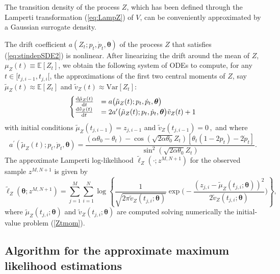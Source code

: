 \documentclass[11pt]{article}
\theoremstyle{definition}
\begin{document}
The transition density of the process $Z$, which has been defined through the Lamperti transformation (\ref{eq:LampZ}) of $V$, can be conveniently approximated by a Gaussian surrogate density. 

The drift coefficient $a(Z_t; p_t, \dot{p}_t, \bm{\theta}) $ of the process $Z$ that satisfies (\ref{eq:stindepSDE2}) is nonlinear. After linearizing the drift around the mean of $Z$, $\mu_Z(t) \equiv \mathbb{E}\left[Z_t\right]$,  we obtain the following system of ODEs to compute, for any $t\in [t_{j,i-1}, t_{j, i}[$, the approximations of the first two central moments of $Z$, say  $\tilde{\mu}_Z(t) \approx \mathbb{E}\left[Z_t\right]$ and $\tilde{v}_Z(t) \approx \text{Var} \left[Z_t\right]$:
\begin{equation}
\begin{cases}
\frac{\dif  \tilde{\mu}_Z (t)}{\dif t}&=  a\big( \tilde{\mu}_Z (t) ; p_t, \dot{p}_t, \bm{\theta} \big)   \\
\frac{\dif  \tilde{v}_Z (t)}{\dif t}&= 2  a^{\prime} \big( \tilde{\mu}_Z (t) ; p_t, \dot{p}_t, \bm{\theta} \big) \tilde{v}_Z (t) + 1
\end{cases}
\label{Ztmom}
\end{equation}
with initial conditions $\tilde{\mu}_Z(t_{j,i-1})= z_{j, i-1}$ and $\tilde{v}_Z(t_{j,i-1})= 0 \,,$ and where 
\begin{equation*}
a^{\prime} \left( \tilde{\mu}_Z (t) ; p_t, \dot{p}_t, \bm{\theta} \right) =    \frac{  (\alpha \theta_0 - \theta_t)  - \cos(\sqrt{2 \alpha \theta_0 } Z_t) [ \theta_t (1 - 2 p_t) - 2  \dot{p}_t ] }{\sin^2{(\sqrt{2 \alpha \theta_0} Z_t)}}.
\end{equation*}
The approximate Lamperti log-likelihood $\tilde{\ell}_Z\left(\cdot ; z^{M, N+1}\right)$ for the observed sample $z^{M, N+1}$ is given by
\begin{equation}
\tilde{\ell}_Z \left(\bm{\theta}; z^{M,N +1}\right) = \sum_{j=1}^M \sum_{i=1}^N \log \left\{ \frac{1}{\sqrt{2 \pi \tilde{v}_Z(t_{j,i}; \bm{\theta})}} \exp \Bigg( -\frac{(z_{j,i} - \tilde{\mu}_Z(t_{j,i};\bm{\theta} ))^2}{2 \tilde{v}_Z(t_{j,i}; \bm{\theta})} \Bigg) \right\},
\label{loglikelihoodZ}
\end{equation}
where $\tilde{\mu}_Z(t_{j,i};\bm{\theta} )$ and $\tilde{v}_Z(t_{j,i};\bm{\theta} )$ are computed solving numerically the initial-value problem (\ref{Ztmom}). 

\subsection{Algorithm for the approximate maximum likelihood estimations} \label{opt_sec}
\end{document}
